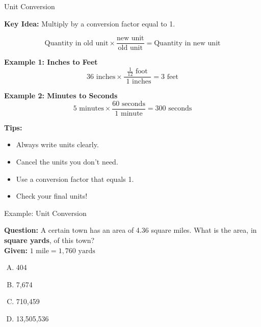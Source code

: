 \documentclass{beamer}
\begin{document}
\begin{frame}{Unit Conversion}

\textbf{Key Idea:} Multiply by a conversion factor equal to 1.

\[
\text{Quantity in old unit} \times \frac{\text{new unit}}{\text{old unit}} = \text{Quantity in new unit}
\]

\vspace{0.5em}
\textbf{Example 1: Inches to Feet}
\[
36 \text{ inches} \times \frac{\frac{1}{12} \text{ foot}}{{} \text{ 1 inches}} = 3 \text{ feet}
\]

\vspace{0.5em}
\textbf{Example 2: Minutes to Seconds}
\[
5 \text{ minutes} \times \frac{60 \text{ seconds}}{1 \text{ minute}} = 300 \text{ seconds}
\]

\vspace{1em}
\textbf{Tips:}
\begin{itemize}
    \item Always write units clearly.
    \item Cancel the units you don’t need.
    \item Use a conversion factor that equals 1.
    \item Check your final units!
\end{itemize}

\end{frame}



\begin{frame}{Example: Unit Conversion}

\textbf{Question:} A certain town has an area of 4.36 square miles. What is the area, in \textbf{square yards}, of this town? \\

\textbf{Given:} \(1 \text{ mile} = 1,760 \text{ yards}\) \\

\begin{enumerate}[(A)]
    \item 404
    \item 7,674
    \item 710,459
    \item 13,505,536
\end{enumerate}

\end{frame}
\end{document}
